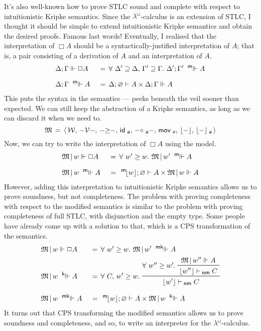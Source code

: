 \documentclass{entcs}
\numberwithin{equation}{thm}
\newcommand{\lambdabox}{\lambda^{\mkern-1mu\sq\mkern-2mu}}
\newcommand{\binop}[1]{-\mathord{#1}-}
\newcommand{\tsf}[1]{\textsf{\upshape{#1}}}
\newcommand{\stsf}[1]{\tsf{\small{#1}}}
\renewcommand{\:}{\mathrel{:}}
\let\oldforall\forall
\renewcommand{\forall}{\oldforall\,}
\newcommand{\0}{\varnothing}
\renewcommand{\geq}{\mathrel{\supseteq}}
\newcommand{\sq}{\Box}
\renewcommand{\e}{\mathrel{\vdash}}
\newcommand{\enm}{\mathrel{\vdash_{\mkern-2mu\stsf{nm}}}}
\newcommand{\M}{\mathfrak{M}}
\newcommand{\W}{\mathcal{W}}
\newcommand{\V}{\mathrel{\mathcal{V}}}
\newcommand{\ida}{\operatorname{\tsf{id}_{\stsf{a}}}}
\newcommand{\compa}{\mathrel{\circ_{\stsf{a}}}}
\newcommand{\movv}{\operatorname{\tsf{mov}_{\stsf{v}}}}
\newcommand{\peek}[1]{\mathopen{\lfloor}{#1}\mathclose{\rfloor}}
\newcommand{\peeka}[1]{\mathopen{\lfloor}{#1}\mathclose{\rfloor_{\mkern-2mu\stsf{a}}}}
\newcommand{\mpeek}[1]{\mathopen{^{\stsf{m}\mkern-3mu}\lfloor}{#1}\mathclose{\rfloor}}
\newcommand{\ee}{\mathrel{\Vdash}}
\newcommand{\kee}{\mathrel{^{\stsf{k}\mkern-6mu}\Vdash}}
\newcommand{\mee}{\mathrel{^{\stsf{m}\mkern-6mu}\Vdash}}
\newcommand{\mkee}{\mathrel{^{\stsf{mk}\mkern-6mu}\Vdash}}
\begin{document}
It's also well-known how to prove STLC sound and complete with respect to intuitionistic Kripke semantics.  Since the $\lambdabox$-calculus is an extension of STLC, I thought it should be simple to extend intuitionistic Kripke semantics and obtain the desired proofs.  Famous last words!  Eventually, I realised that the interpretation of $\sq A$ should be a syntactically-justified interpretation of $A$; that is, a pair consisting of a derivation of $A$ and an interpretation of $A$.
\begin{alignat*}{2}
  & \Delta; \Gamma \ee \sq A \,&&=\, \forall \Delta' \geq \Delta,\,\Gamma' \geq \Gamma.\ \Delta'; \Gamma' \mee A\\[0.5\baselineskip]
  & \Delta; \Gamma \mee A    \,&&=\, \Delta; \0 \e A \times \Delta; \Gamma \ee A
\end{alignat*}
This puts the syntax in the semantics --- peeks beneath the veil sooner than expected.  We can still keep the abstraction of a Kripke semantics, as long as we can discard it when we need to.
  \[\M \,=\, \langle\,\W,\,\binop{\V},\,\binop{\ge},\,\ida,\,\binop{\compa},\,\movv,\,\peek{-},\,\peeka{-}\,\rangle\]
Now, we can try to write the interpretation of $\sq A$ using the model.
\begin{alignat*}{2}
  & \M\,|\,w \ee \sq A \,&&=\, \forall w' \ge w.\ \M\,|\,w' \mee A\\[0.5\baselineskip]
  & \M\,|\,w \mee A    \,&&=\, \mpeek{w}; \0 \e A \times \M\,|\,w \ee A
\end{alignat*}
However, adding this interpretation to intuitionistic Kripke semantics allows us to prove soundness, but not completeness.  The problem with proving completeness with respect to the modified semantics is similar to the problem with proving completeness of full STLC, with disjunction and the empty type.  Some people have already come up with a solution to that, which is a CPS transformation of the semantics.
\begin{alignat*}{2}
  & \M\,|\,w \ee \sq A \,&&=\, \forall w' \ge w.\ \M\,|\,w' \mkee A\\
  & \M\,|\,w \kee A    \,&&=\, \forall C,\,w' \ge w.\ \raisebox{-8pt}{\prftree{\raisebox{8pt}{$\forall w'' \ge w'\mkern-2mu.\ $}\prftree{\M\,|\,w'' \ee A}{\lfloor w'' \rfloor \enm C}}{\lfloor w' \rfloor \enm C}}\\[0.5\baselineskip]
  & \M\,|\,w \mkee A \,&&=\, \mpeek{w}; \0 \e A \times \M\,|\,w \kee A
\end{alignat*}
It turns out that CPS transforming the modified semantics allows us to prove soundness and completeness, and so, to write an interpreter for the $\lambdabox$-calculus.
\end{document}
